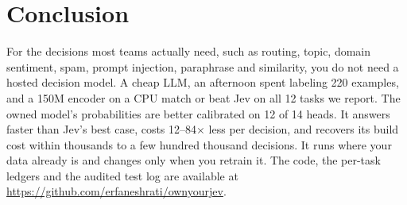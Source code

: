 \documentclass[11pt]{article}
\begin{document}
\section{Conclusion}
For the decisions most teams actually need, such as routing, topic, domain sentiment, spam, prompt injection, paraphrase and similarity, you do not need a hosted decision model.
A cheap LLM, an afternoon spent labeling 220 examples, and a 150M encoder on a CPU match or beat Jev on all 12 tasks we report.
The owned model's probabilities are better calibrated on 12 of 14 heads. It answers faster than Jev's best case, costs 12--84$\times$ less per decision, and recovers its build cost within thousands to a few hundred thousand decisions.
It runs where your data already is and changes only when you retrain it.
The code, the per-task ledgers and the audited test log are available at \url{https://github.com/erfaneshrati/ownyourjev}.




\appendix
\end{document}
